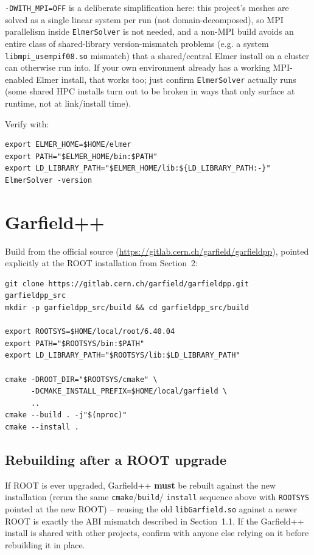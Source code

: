 \documentclass[11pt]{article}
\begin{document}
\texttt{-DWITH\_MPI=OFF} is a deliberate simplification here: this
project's meshes are solved as a single linear system per run (not
domain-decomposed), so MPI parallelism inside \texttt{ElmerSolver} is not
needed, and a non-MPI build avoids an entire class of shared-library
version-mismatch problems (e.g. a system \texttt{libmpi\_usempif08.so}
mismatch) that a shared/central Elmer install on a cluster can otherwise
run into. If your own environment already has a working MPI-enabled Elmer
install, that works too; just confirm \texttt{ElmerSolver} actually runs
(some shared HPC installs turn out to be broken in ways that only surface
at runtime, not at link/install time).

Verify with:
\begin{lstlisting}
export ELMER_HOME=$HOME/elmer
export PATH="$ELMER_HOME/bin:$PATH"
export LD_LIBRARY_PATH="$ELMER_HOME/lib:${LD_LIBRARY_PATH:-}"
ElmerSolver -version
\end{lstlisting}

\section{Garfield++}

Build from the official source
(\url{https://gitlab.cern.ch/garfield/garfieldpp}), pointed explicitly at
the ROOT installation from Section~2:

\begin{lstlisting}
git clone https://gitlab.cern.ch/garfield/garfieldpp.git garfieldpp_src
mkdir -p garfieldpp_src/build && cd garfieldpp_src/build

export ROOTSYS=$HOME/local/root/6.40.04
export PATH="$ROOTSYS/bin:$PATH"
export LD_LIBRARY_PATH="$ROOTSYS/lib:$LD_LIBRARY_PATH"

cmake -DROOT_DIR="$ROOTSYS/cmake" \
      -DCMAKE_INSTALL_PREFIX=$HOME/local/garfield \
      ..
cmake --build . -j"$(nproc)"
cmake --install .
\end{lstlisting}

\subsection{Rebuilding after a ROOT upgrade}

If ROOT is ever upgraded, Garfield++ \textbf{must} be rebuilt against the
new installation (rerun the same \texttt{cmake}/\texttt{build}/
\texttt{install} sequence above with \texttt{ROOTSYS} pointed at the new
ROOT) -- reusing the old \texttt{libGarfield.so} against a newer ROOT is
exactly the ABI mismatch described in Section~1.1. If the Garfield++
install is shared with other projects, confirm with anyone else relying
on it before rebuilding it in place.
\end{document}
